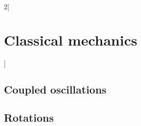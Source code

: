 \documentclass[../../../main_physics.tex]{subfiles}
\begin{document}
\begin{multicols}{2}[\section{Classical mechanics}]
  \subsection{Coupled oscillations}

  \subsection{Rotations}
\end{multicols}
\end{document}

